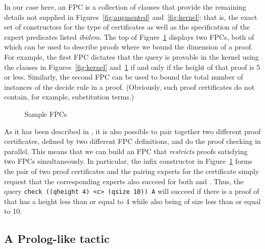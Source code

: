 In our case here, an FPC is a collection of \lP clauses that provide
the remaining details not supplied in Figures~\ref{fig:augmented}
and~\ref{fig:kernel}: that is, the exact set of constructors for the
type of certificates  as well as the specification of the
expert predicates listed \emph{ibidem}.  The top of
Figure~\ref{fig:resources} displays two FPCs, both of which can be
used to describe proofs where we bound the dimension of a proof.  For
example, the first FPC dictates that the query \mbox{} is provable in the kernel using the clauses in
Figures~\ref{fig:kernel} and~\ref{fig:resources} if and only if the
height of that proof is 5 or less.  Similarly, the second FPC can be
used to bound the total number of instances of the decide rule in a
proof.  (Obviously, such proof certificates do not contain, for
example, substitution terms.)
%

\begin{figure}[t]


\caption{Sample FPCs}
\label{fig:resources}
\end{figure}

As it has been described in \cite{blanco17cade}, it is also possible
to pair together two different proof certificates, defined by two
different FPC definitions, and do the proof checking in parallel.
This means that we can build an FPC that \emph{restricts} proofs
satisfying two FPCs simultaneously.  In particular, the infix
constructor  in Figure~\ref{fig:resources} forms the pair of
two proof certificates and the pairing experts for the certificate
 simply request that the corresponding experts
also succeed for both  and . Thus, the query
\verb+check ((qheight 4) <c> (qsize 10)) A+ will succeed if there is a
proof of  that has a height less than or equal to 4 while also
being of size less than or equal to 10.



\subsection{A Prolog-like tactic}

